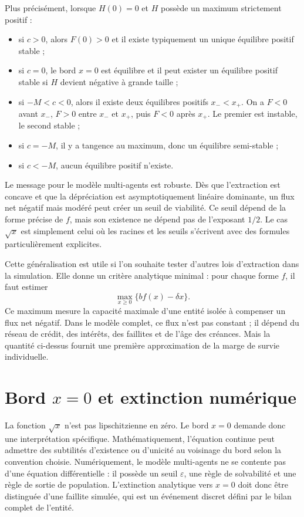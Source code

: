 \documentclass[11pt,a4paper]{article}
\begin{document}
Plus précisément, lorsque \(H(0)=0\) et \(H\) possède un maximum strictement positif :
\begin{itemize}
    \item si \(c>0\), alors \(F(0)>0\) et il existe typiquement un unique équilibre positif stable ;
    \item si \(c=0\), le bord \(x=0\) est équilibre et il peut exister un équilibre positif stable si \(H\) devient négative à grande taille ;
    \item si \(-M<c<0\), alors il existe deux équilibres positifs \(x_-<x_+\). On a \(F<0\) avant \(x_-\), \(F>0\) entre \(x_-\) et \(x_+\), puis \(F<0\) après \(x_+\). Le premier est instable, le second stable ;
    \item si \(c=-M\), il y a tangence au maximum, donc un équilibre semi-stable ;
    \item si \(c<-M\), aucun équilibre positif n'existe.
\end{itemize}

Le message pour le modèle multi-agents est robuste. Dès que l'extraction est concave et que la dépréciation est asymptotiquement linéaire dominante, un flux net négatif mais modéré peut créer un seuil de viabilité. Ce seuil dépend de la forme précise de \(f\), mais son existence ne dépend pas de l'exposant \(1/2\). Le cas \(\sqrt{x}\) est simplement celui où les racines et les seuils s'écrivent avec des formules particulièrement explicites.

Cette généralisation est utile si l'on souhaite tester d'autres lois d'extraction dans la simulation. Elle donne un critère analytique minimal : pour chaque forme \(f\), il faut estimer
\[
    \max_{x\geq 0}\{b f(x)-\delta x\}.
\]
Ce maximum mesure la capacité maximale d'une entité isolée à compenser un flux net négatif. Dans le modèle complet, ce flux n'est pas constant ; il dépend du réseau de crédit, des intérêts, des faillites et de l'âge des créances. Mais la quantité ci-dessus fournit une première approximation de la marge de survie individuelle.

\section{Bord \(x=0\) et extinction numérique}

La fonction \(\sqrt{x}\) n'est pas lipschitzienne en zéro. Le bord \(x=0\) demande donc une interprétation spécifique. Mathématiquement, l'équation continue peut admettre des subtilités d'existence ou d'unicité au voisinage du bord selon la convention choisie. Numériquement, le modèle multi-agents ne se contente pas d'une équation différentielle : il possède un seuil \(\varepsilon\), une règle de solvabilité et une règle de sortie de population. L'extinction analytique vers \(x=0\) doit donc être distinguée d'une faillite simulée, qui est un événement discret défini par le bilan complet de l'entité.
\end{document}
